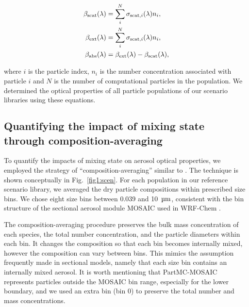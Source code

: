 \documentclass[edeposit,fullpage]{uiucthesis2009}
\makeatletter
\DeclareRobustCommand*\unit[1]
 {\ensuremath{%
   {\thinmuskip3mu\relax
    \def\mu{\text{\textmu}}\def~{\,}%
    \ifx\f@series\testbx\mathbf{#1}\else\mathrm{#1}\fi}}}
\makeatother
\begin{document}
\begin{align}
\centering
    \label{eq:opt-cal1}
    \beta_{\rm scat}(\lambda) &= \sum\limits_i^{N}\sigma_{{\rm scat},i}(\lambda)n_i,\\
    \label{eq:opt-cal2}
    \beta_{\rm ext}(\lambda)  &= \sum\limits_i^{N}\sigma_{{\rm scat},i}(\lambda)n_i, \\
    \label{eq:opt-cal3}
    \beta_{\rm abs}(\lambda)  &= \beta_{\rm ext}(\lambda) - \beta_{\rm scat}(\lambda),
\end{align}

where $i$ is the particle index, $n_i$ is the number concentration
associated with particle $i$ and $N$ is the number of computational
particles in the population. We determined the optical properties of
all particle populations of our scenario libraries using these
equations.

\subsection{Quantifying the impact of mixing state through composition-averaging}
To quantify the impacts of mixing state on aerosol optical properties,
we employed the strategy of ``composition-averaging'' similar to
\citet{Ching2016}. The technique is shown conceptually in
Fig.~\ref{fig1:scen}. For each population in our reference scenario
library, we averaged the dry particle compositions within prescribed
size bins. We chose eight size bins between 0.039 and 10~\unit{\mu m},
consistent with the bin structure of the sectional aerosol module
MOSAIC used in WRF-Chem \citep{fast2006evolution}.

The composition-averaging procedure preserves the bulk mass
concentration of each species, the total number concentration, and the
particle diameters within each bin. It changes the composition so that
each bin becomes internally mixed, however the composition can vary
between bins. This mimics the assumption frequently made in sectional
models, namely that each size bin contains an internally mixed
aerosol. It is worth mentioning that PartMC-MOSAIC represents
particles outside the MOSAIC bin range, especially for the lower
boundary, and we used an extra bin (bin 0) to preserve the total
number and mass concentrations.
\end{document}
